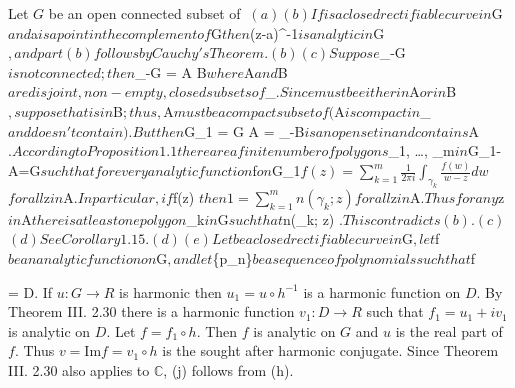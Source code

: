 Let $G$ be an open connected subset of $\

(a) $\Rightarrow$ (b) If $\gamma$ is a closed rectifiable curve in $G$ and $a$ is a point in the complement of $G$ then $(z-a)^{-1}$ is analytic in $G$, and part (b) follows by Cauchy's Theorem.

(b) $\Rightarrow$ (c) Suppose $_{\infty}-G$ is not connected; then $_{\infty}-G = A \cup B$ where $A$ and $B$ are disjoint, non-empty, closed subsets of $_{\infty}$. Since $\infty$ must be either in $A$ or in $B$, suppose that $\infty$ is in $B$; thus, $A$ must be a compact subset of $$ ($A$ is compact in $_{\infty}$ and doesn't contain $\infty$). But then $G_1 = G \cup A = _{\infty}-B$ is an open set in $$ and contains $A$. According to Proposition 1.1 there are a finite number of polygons $\gamma_1, \ldots, \gamma_m$ in $G_1-A=G$ such that for every analytic function $f$ on $G_1$

$$f(z) = \sum_{k=1}^{m} \frac{1}{2\pi i} \int_{\gamma_k} \frac{f(w)}{w-z} dw$$

for all $z$ in $A$. In particular, if $f(z) $ then

$$1 = \sum_{k=1}^{m} n(\gamma_k; z)$$

for all $z$ in $A$. Thus for any $z$ in $A$ there is at least one polygon $\gamma_k$ in $G$ such that $n(\gamma_k; z) $. This contradicts (b).

(c) $\Rightarrow$ (d) See Corollary 1.15.

(d) $\Rightarrow$ (e) Let $\gamma$ be a closed rectifiable curve in $G$, let $f$ be an analytic function on $G$, and let $\{p_n\}$ be a sequence of polynomials such that $f

= D. If $u: G \rightarrow R$ is harmonic then $u_1 = u \circ h^{-1}$ is a harmonic function on $D$. By Theorem III. 2.30 there is a harmonic function $v_1: D \rightarrow R$ such that $f_1 = u_1 + iv_1$ is analytic on $D$. Let $f = f_1 \circ h$. Then $f$ is analytic on $G$ and $u$ is the real part of $f$. Thus $v = \text{Im} f = v_1 \circ h$ is the sought after harmonic conjugate. Since Theorem III. 2.30 also applies to $\mathbb{C}$, (j) follows from (h).